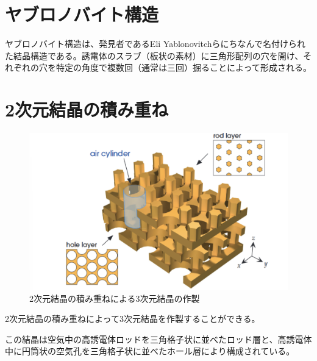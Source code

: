\documentclass[platex,dvipdfmx]{jsreport}
\numberwithin{equation}{section}
\begin{document}
\section{ヤブロノバイト構造}
ヤブロノバイト構造は、発見者であるEli Yablonovitchらにちなんで名付けられた結晶構造である。誘電体のスラブ（板状の素材）に三角形配列の穴を開け、それぞれの穴を特定の角度で複数回（通常は三回）掘ることによって形成される。


\section{2次元結晶の積み重ね}
\begin{figure}[htbp]
  \centering
  \includegraphics[width=0.6\linewidth]{2d.png}
  \caption{2次元結晶の積み重ねによる3次元結晶の作製}
  \label{fig:2d_3d}
\end{figure}
2次元結晶の積み重ねによって3次元結晶を作製することができる。

この結晶は空気中の高誘電体ロッドを三角格子状に並べたロッド層と、高誘電体中に円筒状の空気孔を三角格子状に並べたホール層により構成されている。
\end{document}

